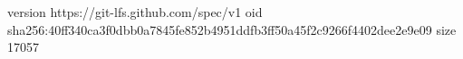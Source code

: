 version https://git-lfs.github.com/spec/v1
oid sha256:40ff340ca3f0dbb0a7845fe852b4951ddfb3ff50a45f2c9266f4402dee2e9e09
size 17057

